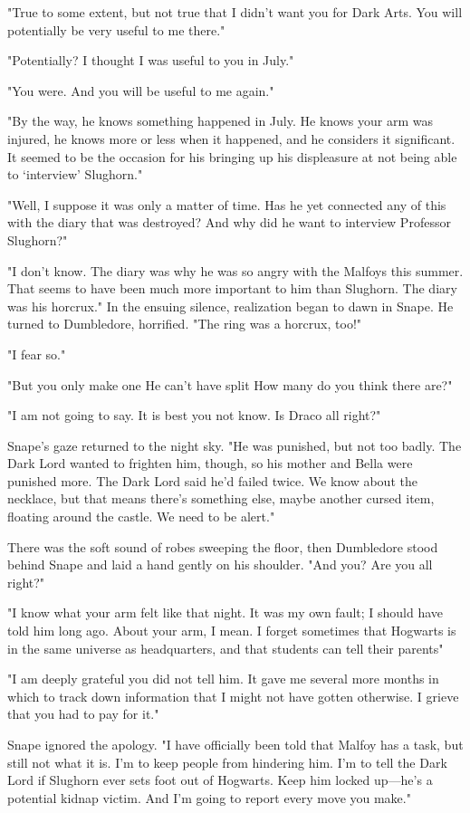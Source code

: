 "True to some extent, but not true that I didn't want you for Dark Arts. You will potentially be very useful to me there."

"Potentially? I thought I was useful to you in July."

"You were. And you will be useful to me again."

"By the way, he knows something happened in July. He knows your arm was injured, he knows more or less when it happened, and he considers it significant. It seemed to be the occasion for his bringing up his displeasure at not being able to `interview' Slughorn."

"Well, I suppose it was only a matter of time. Has he yet connected any of this with the diary that was destroyed? And why did he want to interview Professor Slughorn?"

"I don't know. The diary was why he was so angry with the Malfoys this summer. That seems to have been much more important to him than Slughorn. The diary was his horcrux." In the ensuing silence, realization began to dawn in Snape. He turned to Dumbledore, horrified. "The ring was a horcrux, too!"

"I fear so."

"But you only make one{\el} He can't have split{\el} How many do you think there are?"

"I am not going to say. It is best you not know. Is Draco all right?"

Snape's gaze returned to the night sky. "He was punished, but not too badly. The Dark Lord wanted to frighten him, though, so his mother and Bella were punished more. The Dark Lord said he'd failed twice. We know about the necklace, but that means there's something else, maybe another cursed item, floating around the castle. We need to be alert."

There was the soft sound of robes sweeping the floor, then Dumbledore stood behind Snape and laid a hand gently on his shoulder. "And you? Are you all right?"

"I know what your arm felt like that night. It was my own fault; I should have told him long ago. About your arm, I mean. I forget sometimes that Hogwarts is in the same universe as headquarters, and that students can tell their parents{\el}"

"I am deeply grateful you did not tell him. It gave me several more months in which to track down information that I might not have gotten otherwise. I grieve that you had to pay for it."

Snape ignored the apology. "I have officially been told that Malfoy has a task, but still not what it is. I'm to keep people from hindering him. I'm to tell the Dark Lord if Slughorn ever sets foot out of Hogwarts. Keep him locked up—he's a potential kidnap victim. And I'm going to report every move you make."

